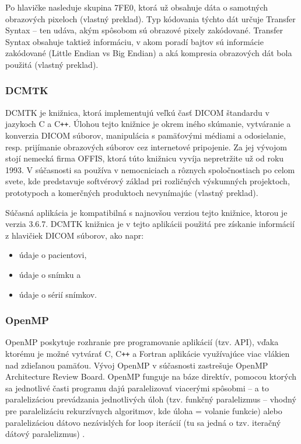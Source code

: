 Po hlavičke nasleduje skupina 7FE0, ktorá už obsahuje dáta o samotných obrazových pixeloch \cite{Varma_2012} (vlastný preklad). Typ kódovania týchto dát určuje Transfer Syntax -- ten udáva, akým spôsobom sú obrazové pixely zakódované. Transfer Syntax obsahuje taktiež informáciu, v akom poradí bajtov sú informácie zakódované (Little Endian vs Big Endian) a aká kompresia obrazových dát bola použitá \cite{dicom_transfer_syntax} (vlastný preklad).

\subsubsection {DCMTK}\label{dcmtk}

DCMTK je knižnica, ktorá implementujú veľkú časť DICOM štandardu v jazykoch C a C\texttt{++}. Úlohou tejto knižnice je okrem iného skúmanie, vytváranie a konverzia DICOM súborov, manipulácia s pamäťovými médiami a odosielanie, resp. prijímanie obrazových súborov cez internetové pripojenie. Za jej vývojom stojí nemecká firma OFFIS, ktorá túto knižnicu vyvíja nepretržite už od roku 1993. V súčasnosti sa používa v nemocniciach a rôznych spoločnostiach po celom svete, kde predstavuje softvérový základ pri rozličných výskumných projektoch, prototypoch a komerčných produktoch nevynímajúc \cite{dcmtk_description} (vlastný preklad). \newline

Súčasná aplikácia je kompatibilná s najnovšou verziou tejto knižnice, ktorou je verzia 3.6.7. DCMTK knižnica je v tejto aplikácii použitá pre získanie informácií z hlavičiek DICOM súborov, ako napr:

\begin{itemize}
\item {údaje o pacientovi,}
\item {údaje o snímku a}
\item {údaje o sérií snímkov.}
\end{itemize}

\subsubsection {OpenMP}

OpenMP poskytuje rozhranie pre programovanie aplikácií (tzv. API), vďaka ktorému je možné vytvárať C, C\texttt{++} a Fortran aplikácie využívajúce viac vlákien nad zdieľanou pamäťou. Vývoj OpenMP v súčasnosti zastrešuje OpenMP Architecture Review Board.
OpenMP funguje na báze direktív, pomocou ktorých sa jednotlivé časti programu dajú paralelizovať viacerými spôsobmi -- a to paralelizáciou prevádzania jednotlivých úloh (tzv. funkčný paralelizmus -- vhodný pre paralelizáciu rekurzívnych algoritmov, kde úloha = volanie funkcie) alebo paralelizáciou dátovo nezávislých for loop iterácií (tu sa jedná o tzv. iteračný dátový paralelizmus) \cite{openmp_description}.


